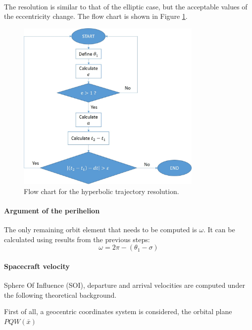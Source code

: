 \begin{itemize}
\begin{multline}
\end{multline}
The resolution is similar to that of the elliptic case, but the acceptable values of the eccentricity change. The flow chart is shown in Figure \ref{Flowhyp}.
\begin{figure}[H]
\centering
\includegraphics[width=0.8\textwidth]{././images/flowcharthyp.jpg} 
\caption{Flow chart for the hyperbolic trajectory resolution.}
\label{Flowhyp}
\end{figure}
\end{itemize}
\paragraph{Argument of the perihelion} 
The only remaining orbit element that needs to be computed is $\omega$. It can be calculated using results from the previous steps:
\begin{equation}
\omega = 2\pi - (\theta _1 - \sigma )
\end{equation}

\paragraph{Spacecraft velocity}
Sphere Of Influence (SOI), departure and arrival velocities are computed under the following theoretical background.

First of all, a geocentric coordinates system is considered, the orbital plane \textit{$PQW(\bar{x})$}





